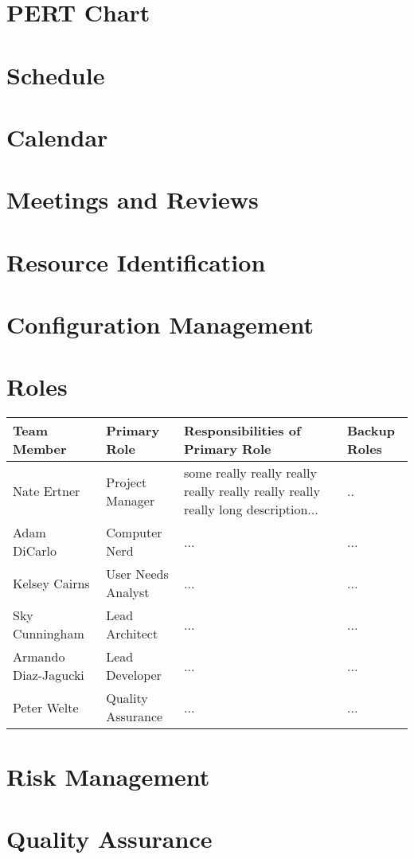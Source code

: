 \documentclass[11pt]{article}
\begin{document}
\section{PERT Chart}
\section{Schedule}
\section{Calendar}
\section{Meetings and Reviews}
\section{Resource Identification}
\section{Configuration Management}
\section{Roles}

\begin{tabular}{|l|l|l|l|}
 \hline
\textbf{Team Member} & \textbf{Primary Role} & \textbf{Responsibilities of Primary Role} & \textbf{Backup Roles}\\ \hline
Nate Ertner & Project Manager & some really really really really really really really really long description... & ..\\ \hline
Adam DiCarlo & Computer Nerd & ... & ...\\ \hline
Kelsey Cairns & User Needs Analyst & ... & ... \\ \hline
Sky Cunningham &  Lead Architect & ... & ... \\ \hline
Armando Diaz-Jagucki & Lead Developer & ... & ... \\ \hline
Peter Welte & Quality Assurance & ... & ...\\ \hline

\end{tabular}


\section{Risk Management}
\section{Quality Assurance}
\end{document}
